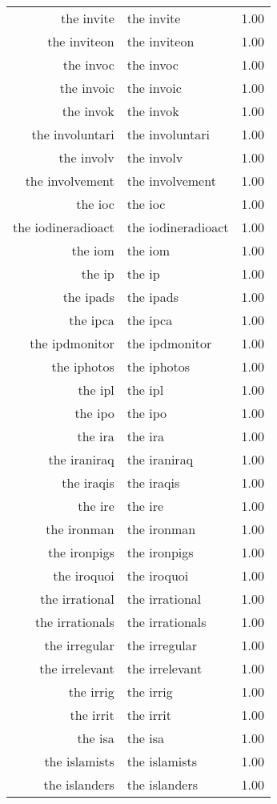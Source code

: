 \begin{table}[ht]
\begin{tabular}{rlr}
  the invite & the invite & 1.00 \\ 
  the inviteon & the inviteon & 1.00 \\ 
  the invoc & the invoc & 1.00 \\ 
  the invoic & the invoic & 1.00 \\ 
  the invok & the invok & 1.00 \\ 
  the involuntari & the involuntari & 1.00 \\ 
  the involv & the involv & 1.00 \\ 
  the involvement & the involvement & 1.00 \\ 
  the ioc & the ioc & 1.00 \\ 
  the iodineradioact & the iodineradioact & 1.00 \\ 
  the iom & the iom & 1.00 \\ 
  the ip & the ip & 1.00 \\ 
  the ipads & the ipads & 1.00 \\ 
  the ipca & the ipca & 1.00 \\ 
  the ipdmonitor & the ipdmonitor & 1.00 \\ 
  the iphotos & the iphotos & 1.00 \\ 
  the ipl & the ipl & 1.00 \\ 
  the ipo & the ipo & 1.00 \\ 
  the ira & the ira & 1.00 \\ 
  the iraniraq & the iraniraq & 1.00 \\ 
  the iraqis & the iraqis & 1.00 \\ 
  the ire & the ire & 1.00 \\ 
  the ironman & the ironman & 1.00 \\ 
  the ironpigs & the ironpigs & 1.00 \\ 
  the iroquoi & the iroquoi & 1.00 \\ 
  the irrational & the irrational & 1.00 \\ 
  the irrationals & the irrationals & 1.00 \\ 
  the irregular & the irregular & 1.00 \\ 
  the irrelevant & the irrelevant & 1.00 \\ 
  the irrig & the irrig & 1.00 \\ 
  the irrit & the irrit & 1.00 \\ 
  the isa & the isa & 1.00 \\ 
  the islamists & the islamists & 1.00 \\ 
  the islanders & the islanders & 1.00 \\ 

\end{tabular}
\end{table}
